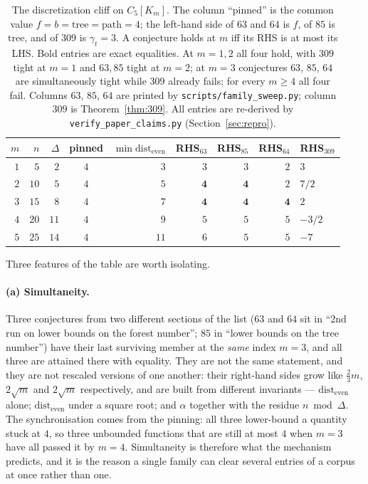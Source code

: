 \documentclass[10pt,a4paper]{article}
\theoremstyle{plain}
\theoremstyle{definition}
\newcommand{\ind}{\alpha}
\newcommand{\forestnum}{f}
\newcommand{\bipnum}{b}
\newcommand{\treenum}{\mathrm{tree}}
\newcommand{\pathnum}{\mathrm{path}}
\newcommand{\de}{\mathrm{dist_{even}}}
\newcommand{\gt}{\gamma_t}
\newcommand{\blow}[2]{#1[K_{#2}]}
\begin{document}
\begin{table}[t]
\centering\small
\begin{tabular}{rrrcrrrrl}
\toprule
$m$ & $n$ & $\Delta$ & pinned & $\min\de$ &
RHS$_{63}$ & RHS$_{85}$ & RHS$_{64}$ & RHS$_{309}$ \\
\midrule
$1$ & $5$  & $2$  & $4$ & $3$  & $3$ & $3$ & $2$ & $3$\\
$2$ & $10$ & $5$  & $4$ & $5$  & $\mathbf{4}$ & $\mathbf{4}$ & $2$ & $7/2$\\
$3$ & $15$ & $8$  & $4$ & $7$  & $\mathbf{4}$ & $\mathbf{4}$ & $\mathbf{4}$ & $2$\\
$4$ & $20$ & $11$ & $4$ & $9$  & $5$ & $5$ & $5$ & $-3/2$\\
$5$ & $25$ & $14$ & $4$ & $11$ & $6$ & $5$ & $5$ & $-7$\\
\bottomrule
\end{tabular}
\caption{The discretization cliff on $\blow{C_5}{m}$. The column ``pinned'' is the common value
$\forestnum = \bipnum = \treenum = \pathnum = 4$; the left-hand side of $63$ and $64$ is
$\forestnum$, of $85$ is $\treenum$, and of $309$ is $\gt = 3$. A conjecture holds at $m$ iff
its RHS is at most its LHS. Bold entries are exact equalities. At $m=1,2$ all four hold, with
$309$ tight at $m=1$ and $63,85$ tight at $m=2$; at $m=3$ conjectures $63$, $85$, $64$ are
simultaneously tight while $309$ already fails; for every $m \ge 4$ all four fail. Columns
$63$, $85$, $64$ are printed by \texttt{scripts/family\_sweep.py}; column $309$ is
Theorem~\ref{thm:309}. All entries are re-derived by
\texttt{verify\_paper\_claims.py} (Section~\ref{sec:repro}).}
\label{tab:cliff}
\end{table}

Three features of the table are worth isolating.

\paragraph{(a) Simultaneity.} Three conjectures from two different sections of the list
($63$ and $64$ sit in ``2nd run on lower bounds on the forest number''; $85$ in ``lower bounds
on the tree number'') have their last surviving member at the \emph{same} index $m = 3$, and all
three are attained there with equality. They are not the same statement, and they are not
rescaled versions of one another: their right-hand sides grow like $\tfrac23 m$, $2\sqrt{m}$ and
$2\sqrt{m}$ respectively, and are built from different invariants --- $\de$ alone; $\de$ under a
square root; and $\ind$ together with the residue $n \bmod \Delta$. The synchronisation comes
from the pinning: all three lower-bound a quantity stuck at $4$, so three unbounded functions
that are still at most $4$ when $m = 3$ have all passed it by $m = 4$. Simultaneity is therefore
what the mechanism predicts, and it is the reason a single family can clear several entries of a
corpus at once rather than one.
\end{document}
